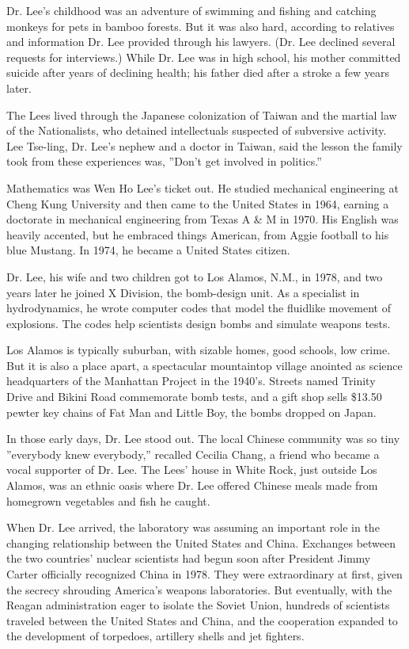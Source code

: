 Dr. Lee's childhood was an adventure of swimming and fishing and
catching monkeys for pets in bamboo forests. But it was also hard,
according to relatives and information Dr. Lee provided through his
lawyers. (Dr. Lee declined several requests for interviews.) While Dr.
Lee was in high school, his mother committed suicide after years of
declining health; his father died after a stroke a few years later.

The Lees lived through the Japanese colonization of Taiwan and the
martial law of the Nationalists, who detained intellectuals suspected of
subversive activity. Lee Tse-ling, Dr. Lee's nephew and a doctor in
Taiwan, said the lesson the family took from these experiences was,
''Don't get involved in politics.''

Mathematics was Wen Ho Lee's ticket out. He studied mechanical
engineering at Cheng Kung University and then came to the United States
in 1964, earning a doctorate in mechanical engineering from Texas A \& M
in 1970. His English was heavily accented, but he embraced things
American, from Aggie football to his blue Mustang. In 1974, he became a
United States citizen.

Dr. Lee, his wife and two children got to Los Alamos, N.M., in 1978, and
two years later he joined X Division, the bomb-design unit. As a
specialist in hydrodynamics, he wrote computer codes that model the
fluidlike movement of explosions. The codes help scientists design bombs
and simulate weapons tests.

Los Alamos is typically suburban, with sizable homes, good schools, low
crime. But it is also a place apart, a spectacular mountaintop village
anointed as science headquarters of the Manhattan Project in the 1940's.
Streets named Trinity Drive and Bikini Road commemorate bomb tests, and
a gift shop sells \$13.50 pewter key chains of Fat Man and Little Boy,
the bombs dropped on Japan.

In those early days, Dr. Lee stood out. The local Chinese community was
so tiny ''everybody knew everybody,'' recalled Cecilia Chang, a friend
who became a vocal supporter of Dr. Lee. The Lees' house in White Rock,
just outside Los Alamos, was an ethnic oasis where Dr. Lee offered
Chinese meals made from homegrown vegetables and fish he caught.

When Dr. Lee arrived, the laboratory was assuming an important role in
the changing relationship between the United States and China. Exchanges
between the two countries' nuclear scientists had begun soon after
President Jimmy Carter officially recognized China in 1978. They were
extraordinary at first, given the secrecy shrouding America's weapons
laboratories. But eventually, with the Reagan administration eager to
isolate the Soviet Union, hundreds of scientists traveled between the
United States and China, and the cooperation expanded to the development
of torpedoes, artillery shells and jet fighters.

